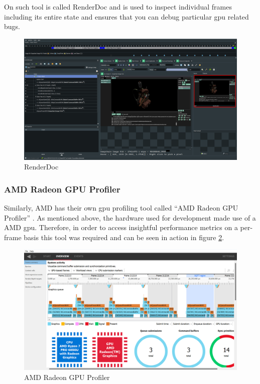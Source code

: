 \documentclass[11pt]{article}
\begin{document}
On such tool is called RenderDoc \cite{renderdoc} and is used to inspect
individual frames including its entire state and ensures that you can debug
particular \gls{gpu} related bugs.

\begin{figure}[h!]
  \centering
  \includegraphics[width=\textwidth]{images/renderdoc.png}
  \caption{RenderDoc}
  \label{fig:renderdoc}
\end{figure}

\subsubsection{AMD Radeon GPU Profiler}
Similarly, AMD has their own \gls{gpu} profiling tool called ``AMD Radeon GPU
Profiler'' \cite{rgp}. As mentioned above, the hardware used for development
made use of a AMD \gls{gpu}. Therefore, in order to access insightful
performance metrics on a per-frame basis this tool was required and can be 
seen in action in figure \ref{fig:amd_profiler}.

\begin{figure}[h!]
  \centering
  \includegraphics[width=\textwidth]{images/amd_profiler.png}
  \caption{AMD Radeon GPU Profiler}
  \label{fig:amd_profiler}
\end{figure}
\end{document}
